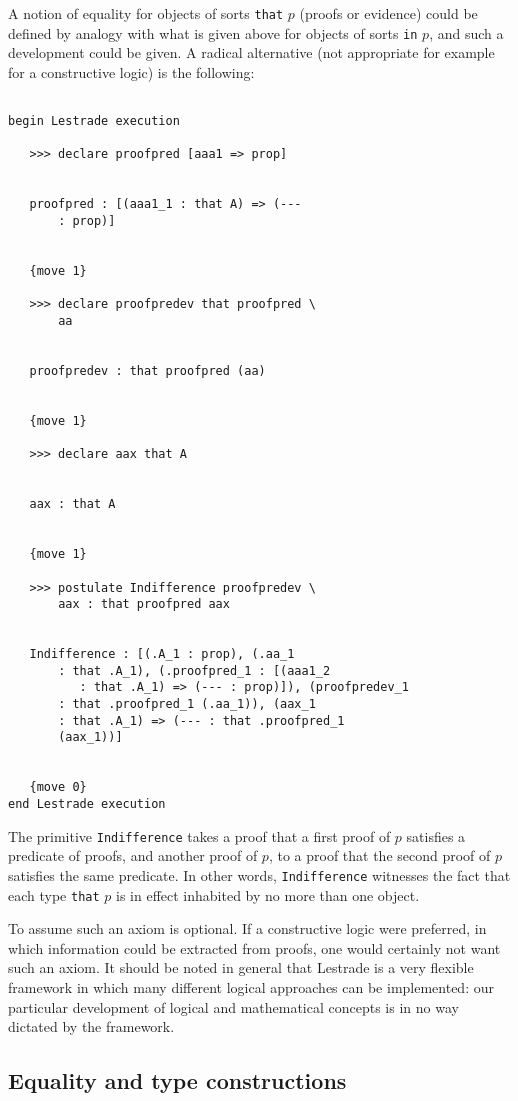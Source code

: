 \documentclass[12pt]{article}
\begin{document}
A notion of equality for objects of sorts {\tt that} $p$ (proofs or evidence) could be defined by analogy with what is given above for objects of sorts
{\tt in} $p$, and such a development could be given.  A radical alternative (not appropriate for example for a constructive logic) is the following:

\begin{verbatim}

begin Lestrade execution

   >>> declare proofpred [aaa1 => prop]


   proofpred : [(aaa1_1 : that A) => (--- 
       : prop)]


   {move 1}

   >>> declare proofpredev that proofpred \
       aa


   proofpredev : that proofpred (aa)


   {move 1}

   >>> declare aax that A


   aax : that A


   {move 1}

   >>> postulate Indifference proofpredev \
       aax : that proofpred aax


   Indifference : [(.A_1 : prop), (.aa_1 
       : that .A_1), (.proofpred_1 : [(aaa1_2 
          : that .A_1) => (--- : prop)]), (proofpredev_1 
       : that .proofpred_1 (.aa_1)), (aax_1 
       : that .A_1) => (--- : that .proofpred_1 
       (aax_1))]


   {move 0}
end Lestrade execution
\end{verbatim}

The primitive {\tt Indifference} takes a proof that a first proof of $p$ satisfies a predicate of proofs, and another proof of $p$, to a proof that the second proof of $p$ satisfies the same predicate.  In other words, {\tt Indifference} witnesses the fact that each type {\tt that} $p$ is in effect inhabited by no more than one object.

To assume such an axiom is optional.  If a constructive logic were preferred, in which information could be extracted from proofs, one would certainly not want such an axiom.  It should be noted in general that Lestrade is a very flexible framework in which many different logical approaches can be implemented:  our particular development of logical and mathematical concepts is in no way dictated by the framework.

\subsection{Equality and type constructions}
\end{document}
